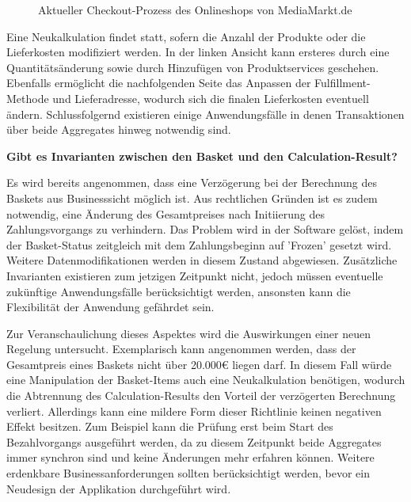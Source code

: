 \vspace{0.5cm}
\begin{figure}[htbp]
	\centering
	\caption{Aktueller Checkout-Prozess des Onlineshops von MediaMarkt.de}
	\label{fig:Checkout-Process}
\end{figure}

Eine Neukalkulation findet statt, sofern die Anzahl der Produkte oder die Lieferkosten modifiziert werden. In der linken Ansicht kann ersteres durch eine Quantitätsänderung sowie durch Hinzufügen von Produktservices geschehen. Ebenfalls ermöglicht die nachfolgenden Seite das Anpassen der Fulfillment-Methode und Lieferadresse, wodurch sich die finalen Lieferkosten eventuell ändern. Schlussfolgernd existieren einige Anwendungsfälle in denen Transaktionen über beide Aggregates hinweg notwendig sind.

\textbf{Gibt es Invarianten zwischen den Basket und den Calculation-Result?}

Es wird bereits angenommen, dass eine Verzögerung bei der Berechnung des Baskets aus Businesssicht möglich ist. Aus rechtlichen Gründen ist es zudem notwendig, eine Änderung des Gesamtpreises nach Initiierung des Zahlungsvorgangs zu verhindern. Das Problem wird in der Software gelöst, indem der Basket-Status zeitgleich mit dem Zahlungsbeginn auf 'Frozen' gesetzt wird. Weitere Datenmodifikationen werden in diesem Zustand abgewiesen. Zusätzliche Invarianten existieren zum jetzigen Zeitpunkt nicht, jedoch müssen eventuelle zukünftige Anwendungsfälle berücksichtigt werden, ansonsten kann die Flexibilität der Anwendung gefährdet sein. 

Zur Veranschaulichung dieses Aspektes wird die Auswirkungen einer neuen Regelung untersucht. Exemplarisch kann angenommen werden, dass der Gesamtpreis eines Baskets nicht über 20.000€ liegen darf. In diesem Fall würde eine Manipulation der Basket-Items auch eine Neukalkulation benötigen, wodurch die Abtrennung des Calculation-Results den Vorteil der verzögerten Berechnung verliert. Allerdings kann eine mildere Form dieser Richtlinie keinen negativen Effekt besitzen. Zum Beispiel kann die Prüfung erst beim Start des Bezahlvorgangs ausgeführt werden, da zu diesem Zeitpunkt beide Aggregates immer synchron sind und keine Änderungen mehr erfahren können. Weitere erdenkbare Businessanforderungen sollten berücksichtigt werden, bevor ein Neudesign der Applikation durchgeführt wird.

